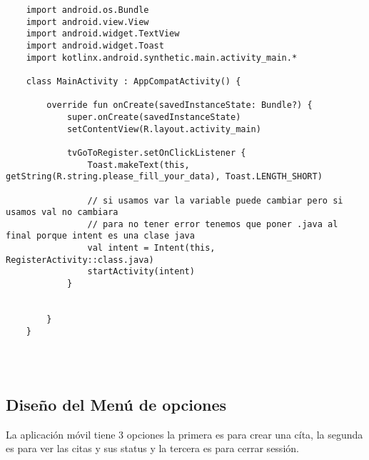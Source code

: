 \documentclass[a4paper]{article}
\begin{document}
	\begin{lstlisting}
	import android.os.Bundle
	import android.view.View
	import android.widget.TextView
	import android.widget.Toast
	import kotlinx.android.synthetic.main.activity_main.*
	
	class MainActivity : AppCompatActivity() {
		
		override fun onCreate(savedInstanceState: Bundle?) {
			super.onCreate(savedInstanceState)
			setContentView(R.layout.activity_main)
			
			tvGoToRegister.setOnClickListener {
				Toast.makeText(this, getString(R.string.please_fill_your_data), Toast.LENGTH_SHORT)
				
				// si usamos var la variable puede cambiar pero si usamos val no cambiara
				// para no tener error tenemos que poner .java al final porque intent es una clase java
				val intent = Intent(this, RegisterActivity::class.java)
				startActivity(intent)
			}
			
			
		}
	}
	
	
	
	\end{lstlisting}

	\subsection{Diseño del Menú de opciones}
	
	La aplicación móvil tiene 3 opciones la primera es para crear una cíta, la segunda es para ver las citas y sus status y la tercera es para cerrar sessión.
	
\end{document}
